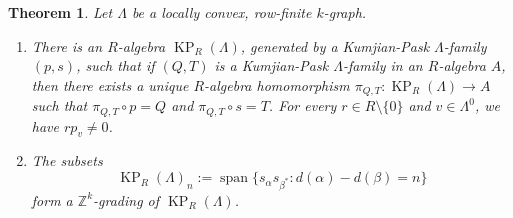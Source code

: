 \documentclass[a4paper,12pt]{amsart}
\numberwithin{equation}{section}
\newtheorem{thm}{Theorem}[section]
\theoremstyle{definition}
\theoremstyle{remark}
\begin{document}
\begin{thm}\label{thm-KP}
Let $\Lambda$ be a locally convex, row-finite $k$-graph.
\begin{enumerate}
\item\label{item-a}
There is an $R$-algebra $\operatorname{KP}_R (\Lambda)$, generated by a Kumjian-Pask 
$\Lambda$-family $(p,s)$, such that
if $(Q,T)$ is a Kumjian-Pask $\Lambda$-family in an $R$-algebra $A$, 
then there exists a unique $R$-algebra homomorphism $\pi_{Q,T}: \operatorname{KP}_R (\Lambda) \to A$ such that 
$\pi_{Q,T} \circ p=Q$ and $\pi_{Q,T} \circ s=T$.  For every 
$r \in R\setminus\{0\}$ and $v\in\Lambda^0$, we have $rp_v \neq 0$.
\item\label{item-b} The subsets
\[\operatorname{KP}_R(\Lambda)_n := {\operatorname{\mathrm{span}}}\{s_\alpha s_{\beta^{*}}: d(\alpha)-d(\beta)=n\}\] 
form a ${\mathbb{Z}}^k$-grading of $\operatorname{KP}_R(\Lambda)$.
\end{enumerate} 
\end{thm}
\end{document}
